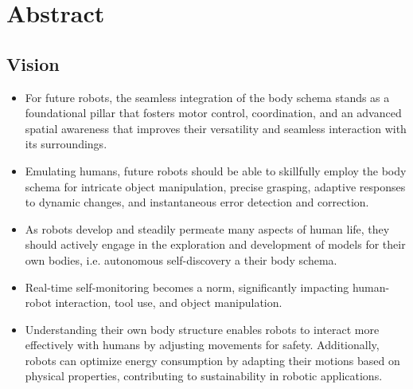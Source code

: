 \documentclass[12pt, a4paper]{article}
\begin{document}
\section*{Abstract}

\subsection*{Vision}

\begin{itemize}
	\item For future robots, the seamless integration of the body schema stands as a foundational pillar that fosters motor control, coordination, and an advanced spatial awareness that improves their versatility and seamless interaction with its surroundings.

	\item Emulating humans, future robots should be able to skillfully employ the body schema for intricate object manipulation, precise grasping, adaptive responses to dynamic changes, and instantaneous error detection and correction.
	
	\item As robots develop and steadily permeate many aspects of human life, they should actively engage in the exploration and development of models for their own bodies, i.e. autonomous self-discovery a their body schema.
	
	\item Real-time self-monitoring becomes a norm, significantly impacting human-robot interaction, tool use, and object manipulation.
	
	\item Understanding their own body structure enables robots to interact more effectively with humans by adjusting movements for safety. Additionally, robots can optimize energy consumption by adapting their motions based on physical properties, contributing to sustainability in robotic applications.
\end{itemize}
\end{document}
